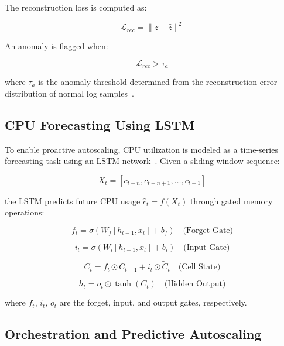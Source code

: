 \documentclass[conference]{IEEEtran}
\begin{document}
The reconstruction loss is computed as:

\begin{equation}
\mathcal{L}_{rec} = \|z - \hat{z}\|^2
\end{equation}

An anomaly is flagged when:

\begin{equation}
\mathcal{L}_{rec} > \tau_a
\end{equation}

where $\tau_a$ is the anomaly threshold determined from the reconstruction error distribution of normal log samples~\cite{sakurada2014anomaly}.

\subsection{CPU Forecasting Using LSTM}

To enable proactive autoscaling, CPU utilization is modeled as a time-series forecasting task using an LSTM network~\cite{hochreiter1997lstm}. Given a sliding window sequence:

\begin{equation}
X_t = [c_{t-n}, c_{t-n+1}, \ldots, c_{t-1}]
\end{equation}

the LSTM predicts future CPU usage $\hat{c}_t = f(X_t)$ through gated memory operations:

\begin{equation}
f_t = \sigma(W_f [h_{t-1}, x_t] + b_f) \quad \text{(Forget Gate)}
\end{equation}

\begin{equation}
i_t = \sigma(W_i [h_{t-1}, x_t] + b_i) \quad \text{(Input Gate)}
\end{equation}

\begin{equation}
C_t = f_t \odot C_{t-1} + i_t \odot \tilde{C}_t \quad \text{(Cell State)}
\end{equation}

\begin{equation}
h_t = o_t \odot \tanh(C_t) \quad \text{(Hidden Output)}
\end{equation}

where $f_t$, $i_t$, $o_t$ are the forget, input, and output gates, respectively.

\subsection{Orchestration and Predictive Autoscaling}
\end{document}
